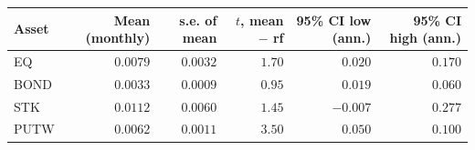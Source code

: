 \begin{tabular}{lrrrrr}
\toprule
Asset & Mean (monthly) & s.e. of mean & $t$, mean $-$ rf & 95\% CI low (ann.) & 95\% CI high (ann.) \\
\midrule
EQ & $0.0079$ & $0.0032$ & $1.70$ & $0.020$ & $0.170$ \\
BOND & $0.0033$ & $0.0009$ & $0.95$ & $0.019$ & $0.060$ \\
STK & $0.0112$ & $0.0060$ & $1.45$ & $-0.007$ & $0.277$ \\
PUTW & $0.0062$ & $0.0011$ & $3.50$ & $0.050$ & $0.100$ \\
\bottomrule
\end{tabular}
